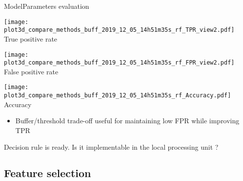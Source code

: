 \begin{frame}{Model}{Parameters evaluation}
    
    \vspace{1.0cm}
    \renewcommand{\ratio}{0.32}
    \centering
    \begin{minipage}[t]{0.9\linewidth}
        \centering
        \begin{minipage}[t]{\ratio\linewidth}
            \centering
            \texttt{[image: plot3d\_compare\_methods\_buff\_2019\_12\_05\_14h51m35s\_rf\_TPR\_view2.pdf]}\\
            \smallskip
            {\small True positive rate}
        \end{minipage}
        \begin{minipage}[t]{\ratio\linewidth}
            \centering
            \texttt{[image: plot3d\_compare\_methods\_buff\_2019\_12\_05\_14h51m35s\_rf\_FPR\_view2.pdf]}\\
            \smallskip
            {\small False positive rate}
        \end{minipage}
        \begin{minipage}[t]{\ratio\linewidth}
            \centering
            \texttt{[image: plot3d\_compare\_methods\_buff\_2019\_12\_05\_14h51m35s\_rf\_Accuracy.pdf]}\\
            \smallskip
            {\small Accuracy}
        \end{minipage}
    \end{minipage}
    
    \medskip
    
    \begin{itemize}
    \centering
        \item Buffer/threshold trade-off useful for maintaining low FPR while improving TPR
    \end{itemize}

    \pause
    \vspace{0.5cm}
    Decision rule is ready. Is it implementable in the local processing unit ?

\end{frame}

\subsection{Feature selection}

